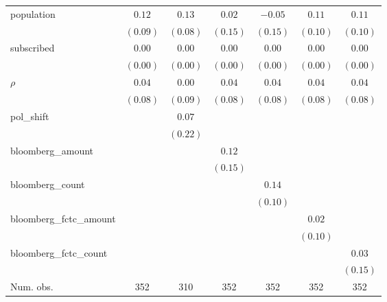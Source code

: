 \begin{table}[!h]
\begin{center}
\begin{tabular}{l c c c c c c }
population              & $0.12$       & $0.13$       & $0.02$       & $-0.05$      & $0.11$       & $0.11$       \\
                        & $(0.09)$     & $(0.08)$     & $(0.15)$     & $(0.15)$     & $(0.10)$     & $(0.10)$     \\
subscribed              & $0.00$       & $0.00$       & $0.00$       & $0.00$       & $0.00$       & $0.00$       \\
                        & $(0.00)$     & $(0.00)$     & $(0.00)$     & $(0.00)$     & $(0.00)$     & $(0.00)$     \\
$\rho$                  & $0.04$       & $0.00$       & $0.04$       & $0.04$       & $0.04$       & $0.04$       \\
                        & $(0.08)$     & $(0.09)$     & $(0.08)$     & $(0.08)$     & $(0.08)$     & $(0.08)$     \\
pol\_shift              &              & $0.07$       &              &              &              &              \\
                        &              & $(0.22)$     &              &              &              &              \\
bloomberg\_amount       &              &              & $0.12$       &              &              &              \\
                        &              &              & $(0.15)$     &              &              &              \\
bloomberg\_count        &              &              &              & $0.14$       &              &              \\
                        &              &              &              & $(0.10)$     &              &              \\
bloomberg\_fctc\_amount &              &              &              &              & $0.02$       &              \\
                        &              &              &              &              & $(0.10)$     &              \\
bloomberg\_fctc\_count  &              &              &              &              &              & $0.03$       \\
                        &              &              &              &              &              & $(0.15)$     \\
\midrule
Num. obs.               & 352          & 310          & 352          & 352          & 352          & 352          \\

\end{tabular}
\end{center}
\end{table}
